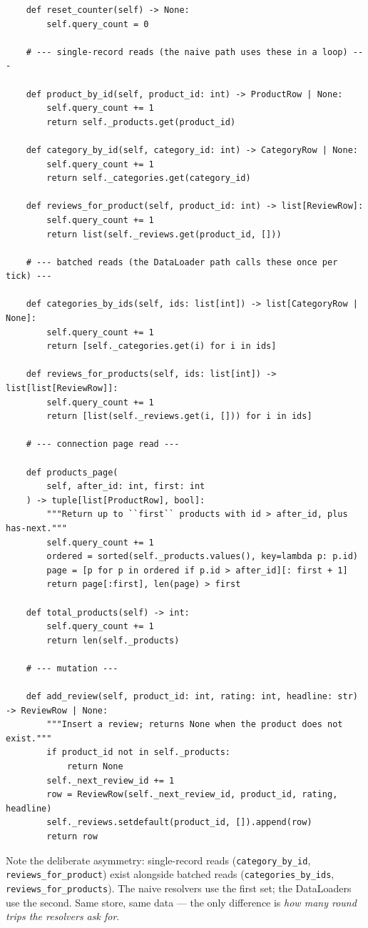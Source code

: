 \begin{verbatim}
    def reset_counter(self) -> None:
        self.query_count = 0

    # --- single-record reads (the naive path uses these in a loop) ---

    def product_by_id(self, product_id: int) -> ProductRow | None:
        self.query_count += 1
        return self._products.get(product_id)

    def category_by_id(self, category_id: int) -> CategoryRow | None:
        self.query_count += 1
        return self._categories.get(category_id)

    def reviews_for_product(self, product_id: int) -> list[ReviewRow]:
        self.query_count += 1
        return list(self._reviews.get(product_id, []))

    # --- batched reads (the DataLoader path calls these once per tick) ---

    def categories_by_ids(self, ids: list[int]) -> list[CategoryRow | None]:
        self.query_count += 1
        return [self._categories.get(i) for i in ids]

    def reviews_for_products(self, ids: list[int]) -> list[list[ReviewRow]]:
        self.query_count += 1
        return [list(self._reviews.get(i, [])) for i in ids]

    # --- connection page read ---

    def products_page(
        self, after_id: int, first: int
    ) -> tuple[list[ProductRow], bool]:
        """Return up to ``first`` products with id > after_id, plus has-next."""
        self.query_count += 1
        ordered = sorted(self._products.values(), key=lambda p: p.id)
        page = [p for p in ordered if p.id > after_id][: first + 1]
        return page[:first], len(page) > first

    def total_products(self) -> int:
        self.query_count += 1
        return len(self._products)

    # --- mutation ---

    def add_review(self, product_id: int, rating: int, headline: str) -> ReviewRow | None:
        """Insert a review; returns None when the product does not exist."""
        if product_id not in self._products:
            return None
        self._next_review_id += 1
        row = ReviewRow(self._next_review_id, product_id, rating, headline)
        self._reviews.setdefault(product_id, []).append(row)
        return row
\end{verbatim}

Note the deliberate asymmetry: single-record reads
(\texttt{category\_by\_id}, \texttt{reviews\_for\_product}) exist alongside
batched reads (\texttt{categories\_by\_ids},
\texttt{reviews\_for\_products}). The naive resolvers use the first set;
the DataLoaders use the second. Same store, same data --- the only
difference is \emph{how many round trips the resolvers ask for}.

